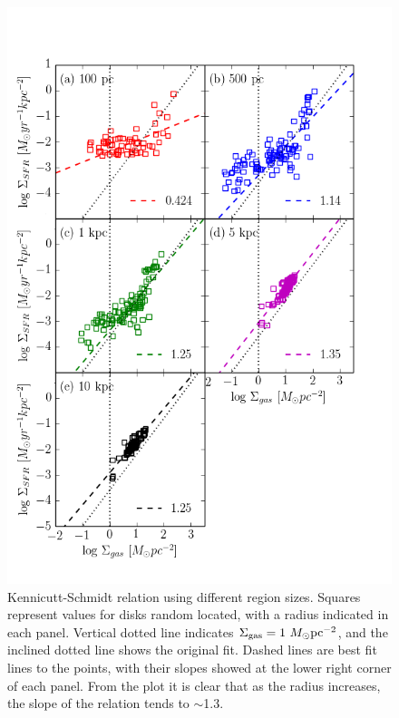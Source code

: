 \documentclass[twocolumn]{aastex}
\newcommand{\msun}{M_\odot}
\newcommand{\sgas}{\Sigma_{\rm gas}}
\begin{document}
	\begin{figure}[p]
	\begin{center}
	\includegraphics[scale=0.8]{./f9.png}
	\caption{Kennicutt-Schmidt relation using different region sizes. Squares represent values for disks random located, with a radius indicated in each panel. Vertical dotted line indicates $\sgas = 1 ~\msun \text{pc}^{-2}$, and the inclined dotted line shows the original \citet{K98} fit. Dashed lines are best fit lines to the points, with their slopes showed at the lower right corner of each panel. From the plot it is clear that as the radius increases, the slope of the relation tends to $\sim$1.3.}
	\label{fig:kssizes}
	\end{center}
	\end{figure}
\end{document}
